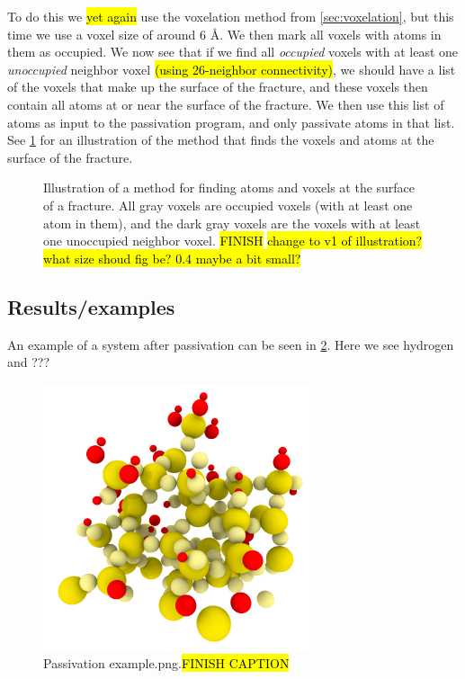 To do this we \hl{yet again} use the voxelation method from \ref{sec:voxelation}, but this time we use a voxel size of around $6\text{ \AA}$. We then mark all voxels with atoms in them as occupied. We now see that if we find all \emph{occupied} voxels with at least one \emph{unoccupied} neighbor voxel \hl{(using 26-neighbor connectivity)}, we should have a list of the voxels that make up the surface of the fracture, and these voxels then contain all atoms at or near the surface of the fracture. We then use this list of atoms as input to the passivation program, and only passivate atoms in that list. See \cref{fig:find_surface_atoms} for an illustration of the method that finds the voxels and atoms at the surface of the fracture.
%
\begin{figure}[htpb]%
    \centering%
    \caption{
        Illustration of a method for finding atoms and voxels at the surface of a fracture. All gray voxels are occupied voxels (with at least one atom in them), and the dark gray voxels are the voxels with at least one unoccupied neighbor voxel. \hl{FINISH} \hl{change to v1 of illustration?} \hl{what size shoud fig be? 0.4 maybe a bit small?}
    }%
    \label{fig:find_surface_atoms}%
\end{figure}%

\subsection{Results/examples}
An example of a system after passivation can be seen in \cref{fig:passivation_example}. Here we see hydrogen and ???
%
\begin{figure}[htpb]%
    \centering%
    \includegraphics[width=0.7\textwidth]{images/passivation/passivation_example04.png}%
    \caption{
        Passivation example.png.\hl{FINISH CAPTION}%
    }%
    \label{fig:passivation_example}%
\end{figure}%

